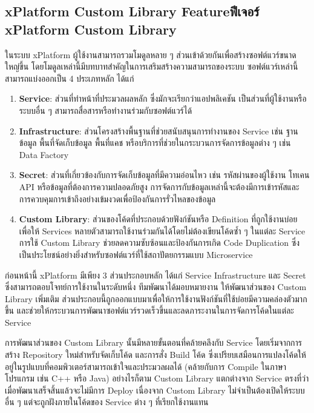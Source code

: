\subsection{\ifenglish xPlatform Custom Library Feature\else ฟีเจอร์ xPlatform Custom Library \fi}
ในระบบ xPlatform ผู้ใช้งานสามารถรวมโมดูลหลาย ๆ ส่วนเข้าด้วยกันเพื่อสร้างซอฟต์แวร์ขนาดใหญ่ขึ้น โดยโมดูลเหล่านี้มีบทบาทสำคัญในการเสริมสร้างความสามารถของระบบ ซอฟต์แวร์เหล่านี้สามารถแบ่งออกเป็น 4 ประเภทหลัก ได้แก่
\begin{enumerate} 
    \item \textbf{Service}: ส่วนที่ทำหน้าที่ประมวลผลหลัก ซึ่งมักจะเรียกว่าแอปพลิเคชัน  เป็นส่วนที่ผู้ใช้งานหรือระบบอื่น ๆ สามารถสื่อสารหรือทำงานร่วมกับซอฟต์แวร์ได้
    \item \textbf{Infrastructure}: ส่วนโครงสร้างพื้นฐานที่ช่วยสนับสนุนการทำงานของ Service เช่น ฐานข้อมูล พื้นที่จัดเก็บข้อมูล พื้นที่แคช หรือบริการที่ช่วยในกระบวนการจัดการข้อมูลต่าง ๆ เช่น Data Factory
    \item \textbf{Secret}: ส่วนที่เกี่ยวข้องกับการจัดเก็บข้อมูลที่มีความอ่อนไหว เช่น รหัสผ่านของผู้ใช้งาน โทเคน API หรือข้อมูลที่ต้องการความปลอดภัยสูง การจัดการกับข้อมูลเหล่านี้จะต้องมีการเข้ารหัสและการควบคุมการเข้าถึงอย่างเข้มงวดเพื่อป้องกันการรั่วไหลของข้อมูล 
    \item \textbf{Custom Library}: ส่วนของโค้ดที่ประกอบด้วยฟังก์ชันหรือ Definition ที่ถูกใช้งานบ่อย เพื่อให้ Services หลายตัวสามารถใช้งานร่วมกันได้โดยไม่ต้องเขียนโค้ดซ้ำ ๆ ในแต่ละ Service การใช้ Custom Library ช่วยลดความซับซ้อนและป้องกันการเกิด Code Duplication ซึ่งเป็นประโยชน์อย่างยิ่งสำหรับซอฟต์แวร์ที่ใช้สถาปัตยกรรมแบบ Microservice 
\end{enumerate}

ก่อนหน้านี้ xPlatform มีเพียง 3 ส่วนประกอบหลัก ได้แก่ Service Infrastructure และ Secret ซึ่งสามารถตอบโจทย์การใช้งานในระดับหนึ่ง ทีมพัฒนาได้มอบหมายงาน  ให้พัฒนาส่วนของ Custom Library เพิ่มเติม ส่วนประกอบนี้ถูกออกแบบมาเพื่อให้การใช้งานฟังก์ชันที่ใช้บ่อยมีความคล่องตัวมากขึ้น และช่วยให้กระบวนการพัฒนาซอฟต์แวร์รวดเร็วขึ้นและลดภาระงานในการจัดการโค้ดในแต่ละ Service

การพัฒนาส่วนของ Custom Library นั้นมีหลายขั้นตอนที่คล้ายคลึงกับ Service โดยเริ่มจากการสร้าง Repository ใหม่สำหรับจัดเก็บโค้ด และการสั่ง Build โค้ด ซึ่งเปรียบเสมือนการแปลงโค้ดให้อยู่ในรูปแบบที่คอมพิวเตอร์สามารถเข้าใจและประมวลผลได้ (คล้ายกับการ Compile ในภาษาโปรแกรม เช่น C++ หรือ Java) อย่างไรก็ตาม Custom Library แตกต่างจาก Service ตรงที่ว่าเมื่อพัฒนาเสร็จสิ้นแล้วจะไม่มีการ Deploy เนื่องจาก Custom Library ไม่จำเป็นต้องเปิดให้ระบบอื่น ๆ แต่จะถูกฝังภายในโค้ดของ Service ต่าง ๆ ที่เรียกใช้งานแทน

